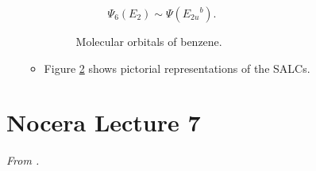 \documentclass[../notes.tex]{subfiles}
\begin{document}
\begin{itemize}
\begin{itemize}
\begin{figure}[h!]
\begin{subfigure}[b]{0.25\linewidth}
                \caption{$\Psi_6(E_2)\sim\Psi({E_{2u}}^b)$.}
                \label{fig:benzeneMOsf}
            \end{subfigure}
            \caption{Molecular orbitals of benzene.}
            \label{fig:benzeneMOs}
        \end{figure}
        \item Figure \ref{fig:benzeneMOs} shows pictorial representations of the SALCs.
    \end{itemize}
\end{itemize}



\section{Nocera Lecture 7}
\emph{From \textcite{bib:NoceraLectures}.}
\end{document}
